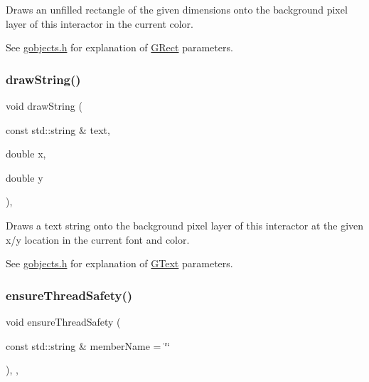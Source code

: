 Draws an unfilled rectangle of the given dimensions onto the background pixel layer of this interactor in the current color. 

See \mbox{\hyperlink{gobjects_8h_source}{gobjects.\+h}} for explanation of \mbox{\hyperlink{classsgl_1_1GRect}{G\+Rect}} parameters. \mbox{\label{classsgl_1_1GDrawingSurface_ad4e8551a753a77135792bbee97013675}} 
\subsubsection{\texorpdfstring{draw\+String()}{drawString()}}
{\footnotesize\ttfamily void draw\+String (\begin{DoxyParamCaption}\item[{const std\+::string \&}]{text,  }\item[{double}]{x,  }\item[{double}]{y }\end{DoxyParamCaption})\hspace{0.3cm}{\ttfamily [virtual]}, {\ttfamily [inherited]}}



Draws a text string onto the background pixel layer of this interactor at the given x/y location in the current font and color. 

See \mbox{\hyperlink{gobjects_8h_source}{gobjects.\+h}} for explanation of \mbox{\hyperlink{classsgl_1_1GText}{G\+Text}} parameters. \mbox{\label{classsgl_1_1GObservable_a284f31528c0520f8e545c03ac9eeac74}} 
\subsubsection{\texorpdfstring{ensure\+Thread\+Safety()}{ensureThreadSafety()}}
{\footnotesize\ttfamily void ensure\+Thread\+Safety (\begin{DoxyParamCaption}\item[{const std\+::string \&}]{member\+Name = {\ttfamily \char`\"{}\char`\"{}} }\end{DoxyParamCaption})\hspace{0.3cm}{\ttfamily [protected]}, {\ttfamily [virtual]}, {\ttfamily [inherited]}}



